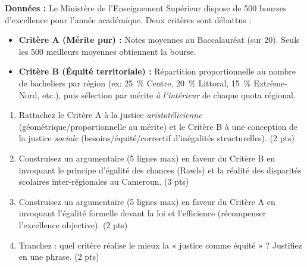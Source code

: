 \documentclass[11pt]{article}
\begin{document}
\begin{exercice}
\textbf{Données :} Le Ministère de l'Enseignement Supérieur dispose de \num{500} bourses d'excellence pour l'année académique. Deux critères sont débattus :
\begin{itemize}
    \item \textbf{Critère A (Mérite pur) :} Notes moyennes au Baccalauréat (sur 20). Seuls les \num{500} meilleurs moyennes obtiennent la bourse.
    \item \textbf{Critère B (Équité territoriale) :} Répartition proportionnelle au nombre de bacheliers par région (ex: \SI{25}{\%} Centre, \SI{20}{\%} Littoral, \SI{15}{\%} Extrême-Nord, etc.), puis sélection par mérite \textit{à l'intérieur} de chaque quota régional.
\end{itemize}
\begin{enumerate}
    \item Rattachez le Critère A à la justice \textit{aristotélicienne} (géométrique/proportionnelle au mérite) et le Critère B à une conception de la justice \textit{sociale} (besoins/équité/correctif d'inégalités structurelles). (2 pts)
    \item Construisez un argumentaire (5 lignes max) en faveur du Critère B en invoquant le principe d'égalité des chances (Rawls) et la réalité des disparités scolaires inter-régionales au Cameroun. (3 pts)
    \item Construisez un argumentaire (5 lignes max) en faveur du Critère A en invoquant l'égalité formelle devant la loi et l'efficience (récompenser l'excellence objective). (2 pts)
    \item Tranchez : quel critère réalise le mieux la « justice comme équité » ? Justifiez en une phrase. (2 pts)
\end{enumerate}
\end{exercice}
\end{document}
